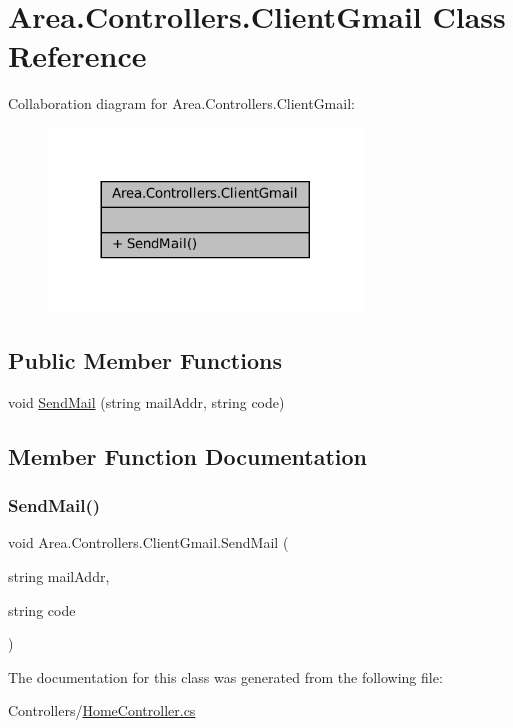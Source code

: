 \hypertarget{classArea_1_1Controllers_1_1ClientGmail}{}\section{Area.\+Controllers.\+Client\+Gmail Class Reference}
\label{classArea_1_1Controllers_1_1ClientGmail}


Collaboration diagram for Area.\+Controllers.\+Client\+Gmail\+:
\nopagebreak
\begin{figure}[H]
\begin{center}
\leavevmode
\includegraphics[width=236pt]{classArea_1_1Controllers_1_1ClientGmail__coll__graph}
\end{center}
\end{figure}
\subsection*{Public Member Functions}
\begin{DoxyCompactItemize}
\item 
void \mbox{\hyperlink{classArea_1_1Controllers_1_1ClientGmail_a647e7e52a44ff6d0e7530163f16a60ea}{Send\+Mail}} (string mail\+Addr, string code)
\end{DoxyCompactItemize}


\subsection{Member Function Documentation}
\mbox{\label{classArea_1_1Controllers_1_1ClientGmail_a647e7e52a44ff6d0e7530163f16a60ea}} 
\subsubsection{\texorpdfstring{Send\+Mail()}{SendMail()}}
{\footnotesize\ttfamily void Area.\+Controllers.\+Client\+Gmail.\+Send\+Mail (\begin{DoxyParamCaption}\item[{string}]{mail\+Addr,  }\item[{string}]{code }\end{DoxyParamCaption})\hspace{0.3cm}{\ttfamily [inline]}}



The documentation for this class was generated from the following file\+:\begin{DoxyCompactItemize}
\item 
Controllers/\mbox{\hyperlink{HomeController_8cs}{Home\+Controller.\+cs}}\end{DoxyCompactItemize}
